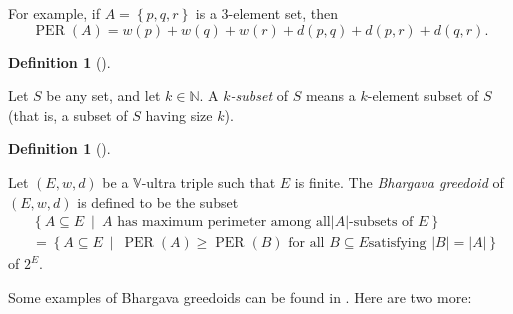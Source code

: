 \documentclass[numbers=enddot,12pt,final,onecolumn,notitlepage]{scrartcl}%
\theoremstyle{definition}
\newtheorem{defi}[theo]{Definition}
\newenvironment{definition}[1][]
{\begin{defi}[#1]\begin{leftbar}}
{\end{leftbar}\end{defi}}
\renewcommand{\geq}{\geqslant}
\theoremstyle{plainsl}
\begin{document}
For example, if $A=\left\{  p,q,r\right\}  $ is a $3$-element set, then%
\[
\operatorname*{PER}\left(  A\right)  =w\left(  p\right)  +w\left(  q\right)
+w\left(  r\right)  +d\left(  p,q\right)  +d\left(  p,r\right)  +d\left(
q,r\right)  .
\]


\begin{definition}
Let $S$ be any set, and let $k\in\mathbb{N}$. A $k$\textit{-subset} of $S$
means a $k$-element subset of $S$ (that is, a subset of $S$ having size $k$).
\end{definition}

\begin{definition}
\label{def.bhar-greed}Let $\left(  E,w,d\right)  $ be a $\mathbb{V}$-ultra
triple such that $E$ is finite. The \textit{Bhargava greedoid} of $\left(
E,w,d\right)  $ is defined to be the subset%
\begin{align*}
&  \left\{  A\subseteq E\ \mid\ A\text{ has maximum perimeter among all
}\left\vert A\right\vert \text{-subsets of }E\right\} \\
&  =\left\{  A\subseteq E\ \mid\ \operatorname*{PER}\left(  A\right)
\geq\operatorname*{PER}\left(  B\right)  \text{ for all }B\subseteq E\text{
satisfying }\left\vert B\right\vert =\left\vert A\right\vert \right\}
\end{align*}
of $2^{E}$.
\end{definition}

Some examples of Bhargava greedoids can be found in \cite[\S 6.2]{GriPet19}.
Here are two more:

\Needspace{6cm}
\end{document}
